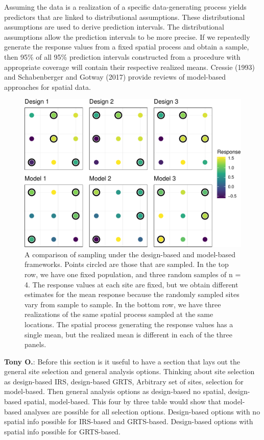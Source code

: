 \documentclass[]{elsarticle} %
\begin{document}
Assuming the data is a realization of a specific data-generating process
yields predictors that are linked to distributional assumptions. These
distributional assumptions are used to derive prediction intervals. The
distributional assumptions allow the prediction intervals to be more
precise. If we repeatedly generate the response values from a fixed
spatial process and obtain a sample, then 95\% of all 95\% prediction
intervals constructed from a procedure with appropriate coverage will
contain their respective realized means. Cressie (1993) and
Schabenberger and Gotway (2017) provide reviews of model-based
approaches for spatial data.

\begin{figure}
\includegraphics[width=1\linewidth]{SpatialDVM_Manuscript_files/figure-latex/fig1-1} \caption{A comparison of sampling under the design-based and model-based frameworks. Points circled are those that are sampled. In the top row, we have one fixed population, and three random samples of n = 4. The response values at each site are fixed, but we obtain different estimates for the mean response because the randomly sampled sites vary from sample to sample. In the bottom row, we have three realizations of the same spatial process sampled at the same locations. The spatial process generating the response values has a single mean, but the realized mean is different in each of the three panels.}\label{fig:fig1}
\end{figure}

\textbf{Tony O.}: Before this section is it useful to have a section
that lays out the general site selection and general analysis options.
Thinking about site selection as design-based IRS, design-based GRTS,
Arbitrary set of sites, selection for model-based. Then general analysis
options as design-based no spatial, design-based spatial, model-based.
This four by three table would show that model-based analyses are
possible for all selection options. Design-based options with no spatial
info possible for IRS-based and GRTS-based. Design-based options with
spatial info possible for GRTS-based.
\end{document}
